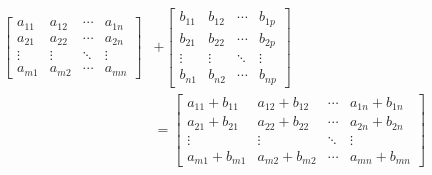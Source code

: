 \begin{align} \label{eq:matrix_sum}
	\begin{bmatrix}
		a_{11} & a_{12} & \cdots & a_{1n} \\
		a_{21} & a_{22} & \cdots & a_{2n} \\
		\vdots & \vdots & \ddots & \vdots \\
		a_{m1} & a_{m2} & \cdots & a_{mn}
	\end{bmatrix}
	 & +
	\begin{bmatrix}
		b_{11} & b_{12} & \cdots & b_{1p} \\
		b_{21} & b_{22} & \cdots & b_{2p} \\
		\vdots & \vdots & \ddots & \vdots \\
		b_{n1} & b_{n2} & \cdots & b_{np}
	\end{bmatrix}
	\nonumber \\
	 & =
	\begin{bmatrix}
		a_{11} + b_{11} & a_{12} + b_{12} & \cdots & a_{1n} + b_{1n} \\
		a_{21} + b_{21} & a_{22} + b_{22} & \cdots & a_{2n} + b_{2n} \\
		\vdots          & \vdots          & \ddots & \vdots          \\
		a_{m1} + b_{m1} & a_{m2} + b_{m2} & \cdots & a_{mn} + b_{mn}
	\end{bmatrix}
\end{align}

